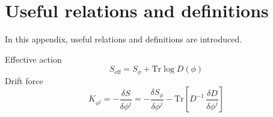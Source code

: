 
\chapter{Useful relations and definitions} %
\label{chap:AppendixA} %
In this appendix, useful relations and definitions are introduced.










Effective action
\begin{equation*}
    S_{\text{eff}} = S_\phi + \text{Tr} \log D(\phi)
\end{equation*}
Drift force
\begin{equation*}
    K_{\phi^j} = - \frac{\delta S}{\delta \phi^j} = - \frac{\delta S_\phi}{\delta \phi^j} - \text{Tr} \left[ D^{-1} \, \frac{\delta D}{\delta \phi^j} \right]
\end{equation*}
